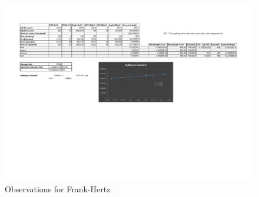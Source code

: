 	\clearpage
	\begin{figure}[bth]
		\begin{center}
			\includegraphics[width=1.3\linewidth]{gfx/exp3.pdf}
		\end{center}
	\caption[Observations for Frank-Hertz]{Observations for Frank-Hertz}
	\label{e3_result}
	\end{figure}
